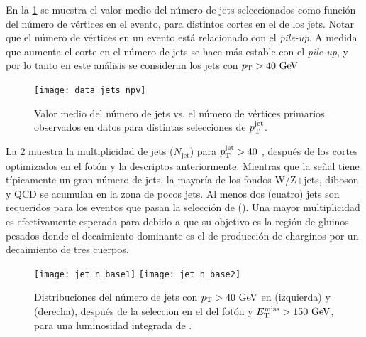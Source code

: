 En la \cref{fig:jets_npv} se muestra el valor medio del número de jets
seleccionados como función del número de vértices en el evento, para distintos
cortes en el {\pt} de los jets. Notar que el número de vértices en un evento
está relacionado con el \emph{pile-up}. A medida que aumenta el corte en {\pt}
el número de jets se hace más estable con el \emph{pile-up}, y por lo tanto en
este análisis se consideran los jets con $\pt>40\gev$



\begin{figure}[!h]
  \centering
  \texttt{[image: data\_jets\_npv]}
  \caption{Valor medio del número de jets vs. el número de vértices primarios
    observados en datos para distintas selecciones de $p_{\mathrm{T}}^{\mathrm{jet}}$.}
    \label{fig:jets_npv}
\end{figure}




La \cref{fig:opt_jet_n} muestra la multiplicidad de jets ($N_{\mathrm{jet}}$)
para $p_{\mathrm{T}}^{\mathrm{jet}} > 40$ \gev, después de los cortes optimizados en el
fotón y la {\met} descriptos anteriormente. Mientras que la señal tiene
típicamente un gran número de jets, la mayoría de los fondos W/Z+jets, diboson y
QCD se acumulan en la zona de pocos jets. Al menos dos (cuatro) jets son
requeridos para los eventos que pasan la selección de {\SRL} ({\SRH}). Una mayor
multiplicidad es efectivamente esperada para {\SRL} debido a que su objetivo es
la región de gluinos pesados donde el decaimiento dominante es el de producción
de charginos por un decaimiento de tres cuerpos.

\begin{figure}[!h]
  \centering
  \texttt{[image: jet\_n\_base1]}
  \texttt{[image: jet\_n\_base2]}
  \caption{Distribuciones del número de jets con $\pt > 40 \gev$ en {\SRL} (izquierda) y {\SRH} (derecha),
    después de la seleccion en el {\pt} del fotón y $\met > 150\gev$,
    para una luminosidad integrada de {\ilumi}.}
  \label{fig:opt_jet_n}
\end{figure}

